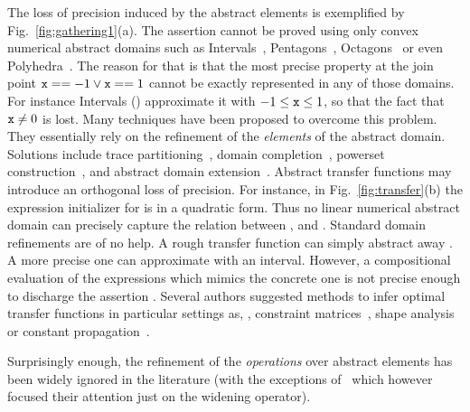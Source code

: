 \documentclass{llncs}
\begin{document}
The loss of precision induced by the abstract elements is exemplified by  Fig.~\ref{fig:gathering1}(a). 
The assertion cannot be proved using only convex numerical abstract domains such as Intervals~\cite{CousotCousot77}, Pentagons~\cite{LogozzoMaf08}, Octagons~\cite{Mine01-2} or even Polyhedra~\cite{CousotHalbwachs78}.
The reason for that is that the most precise property at the join point  $\mathtt{x} == -1 \vee \mathtt{x} == 1$ cannot be exactly represented in any of those domains.
For instance Intervals (\Intervals) approximate it with $-1 \leq \mathtt{x} \leq 1$, so that the fact that $\mathtt{x} \neq 0$ is lost.
Many techniques have been proposed to overcome this problem. 
They essentially rely on the refinement of the \emph{elements} of the abstract domain.
Solutions include trace partitioning~\cite{Tzolovski98,MauborgneRival05,DasEtAl02}, domain completion~\cite{CousotCousot92-1}, powerset construction~\cite{BagnaraEtAl04,ManevichEtAl06}, and abstract domain extension~\cite{PeronHalbwachs07}.
Abstract transfer functions may introduce an orthogonal loss of precision.
For instance, in Fig.~\ref{fig:transfer}(b) the expression initializer for  is in a quadratic form.
Thus no linear numerical abstract domain can precisely capture the relation
between ,  and .
Standard domain refinements are of no help.
A rough transfer function can simply abstract away .
A more precise one can  approximate   with an interval.
However, a compositional evaluation of the expressions which mimics the concrete
one is not precise enough to discharge the assertion .
Several authors suggested methods to infer
optimal transfer functions in particular settings as, \eg, constraint
matrices~\cite{Monniaux09}, shape analysis~\cite{Yorsh04} or constant propagation~\cite{ColbyLee96}.

Surprisingly enough, the refinement of the \emph{operations} over abstract
elements has been widely ignored in the literature (with the
 exceptions of~\cite{GulavaniEtAl08,BagnaraEtAl04,GonnordHalbwachs06,GopanReps06} which however focused
 their attention just on   the widening operator).
\end{document}
